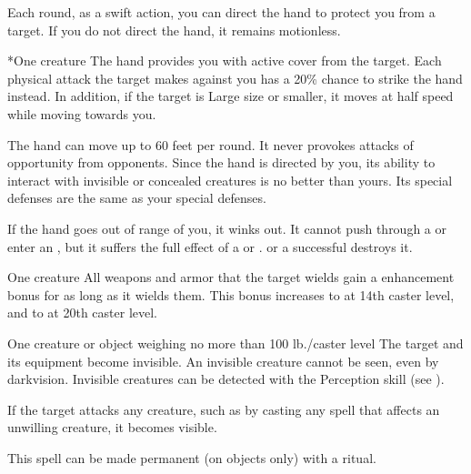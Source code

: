 Each round, as a swift action, you can direct the hand to protect you from a target. If you do not direct the hand, it remains motionless.
\begin{spelltarget}*{One creature}
    \spelleffect The hand provides you with active cover from the target. Each physical attack the target makes against you has a 20\% chance to strike the hand instead. In addition, if the target is Large size or smaller, it moves at half speed while moving towards you.
\end{spelltarget}
\spellnotes The hand can move up to 60 feet per round. It never provokes attacks of opportunity from opponents. Since the hand is directed by you, its ability to interact with invisible or concealed creatures is no better than yours. Its special defenses are the same as your special defenses.

If the hand goes out of range of you, it winks out. It cannot push through a  or enter an , but it suffers the full effect of a  or .  or a successful  destroys it.

\spellrng{\rngclose}
\spelldur{\durshort}
\begin{spelltarget}{One creature}
    \spelleffect All weapons and armor that the target wields gain a  enhancement bonus for as long as it wields them. This bonus increases to  at 14th caster level, and to  at 20th caster level.
\end{spelltarget}

\spellrng{\rngclose}
\spelldur{\durshort \dismissable}
\begin{spelltarget}{One creature or object weighing no more than 100 lb./caster level}
    \spelleffect The target and its equipment become invisible. An invisible creature cannot be seen, even by darkvision. Invisible creatures can be detected with the Perception skill (see ).
    
    If the target attacks any creature, such as by casting any spell that affects an unwilling creature, it becomes visible.
\end{spelltarget}
\spellnotes This spell can be made permanent (on objects only) with a  ritual.

